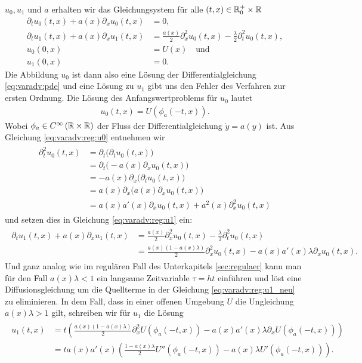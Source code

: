 $u_0, u_1$ und $a$ erhalten wir das Gleichungsystem für alle $(t,x) \in \mathbb R^+_0
\times \mathbb R$
\begin{align}
\label{eq:varadv:reg:u0}
\partial_t u_0(t,x) + a(x) \partial_x u_0(t, x) &= 0,\\
\label{eq:varadv:reg:u1}
\partial_t u_1(t,x) + a(x) \partial_x u_1(t, x) &= \frac{a(x)}{2} \partial^2_x u_0(t,x) - \frac{\lambda}{2} \partial^2_t u_0(t,x),\\
u_0(0,x) &= U(x) \quad \text{und}\\
u_1(0,x) &= 0.
\end{align}
Die Abbildung $u_0$ ist dann also eine Lösung der Differentialgleichung
\eqref{eq:varadv:pde} und eine Lösung zu $u_1$ gibt uns den Fehler des Verfahren
zur ersten Ordnung.
Die Lösung des Anfangswertproblems für $u_0$ lautet 
\begin{align}
\label{eq:varadv:reg:u0_loesung}
u_0(t,x) = U( \phi_a(-t, x) ).
\end{align}
Wobei $\phi_a \in C^\infty \left( \mathbb R \times \mathbb R \right)$ der Fluss der Differentialgleichung $\dot y = a(y)$ ist.
Aus Gleichung \eqref{eq:varadv:reg:u0} entnehmen wir
\begin{align}
\begin{split}
\partial^2_t u_0(t,x) &= \partial_t \bigl( \partial_t u_0(t,x) \bigr)\\
&= \partial_t \bigl( - a(x) \partial_x u_0(t, x) \bigr)\\
&= - a(x) \partial_x \bigl( \partial_t u_0(t, x) \bigr)\\
&= a(x) \partial_x \bigl( a(x) \partial_x u_0(t, x) \bigr)\\
&= a(x) a'(x) \partial_x u_0(t,x) + a^2(x) \partial^2_x u_0(t,x)
\end{split}
\end{align}
und setzen dies in Gleichung \eqref{eq:varadv:reg:u1} ein:
\begin{align}\label{eq:varadv:reg:u1_neu}
\begin{split}
\partial_t u_1(t,x) + a(x) \partial_x u_1(t, x) &= \frac{a(x)}{2} \partial^2_x u_0(t,x) - \frac{\lambda}{2} \partial^2_t u_0(t,x)\\
&= \frac{a(x)(1 - a(x) \lambda)}{2} \partial^2_x u_0(t,x) - a(x) a'(x) \lambda \partial_x u_0(t,x).
\end{split}
\end{align}
Und ganz analog wie im regulären Fall des Unterkapitels \ref{sec:regulaer} kann
man für den Fall $a(x)\lambda < 1$ ein langsame Zeitvariable $\tau = ht$
einführen und löst eine Diffusionsgleichung um die Quellterme in der Gleichung
\eqref{eq:varadv:reg:u1_neu} zu eliminieren.
In dem Fall, dass in einer offenen Umgebung $U$ die Ungleichung $a(x)\lambda > 1$
gilt, schreiben wir für $u_1$ die Lösung
\begin{align}
\begin{split}
u_1(t,x) &= t \left( \frac{a(x)(1 - a(x) \lambda)}{2} \partial^2_x U( \phi_a(-t, x) ) - a(x) a'(x) \lambda \partial_x U( \phi_a(-t, x) )\right)\\
&= t a(x) a'(x) \left( \frac{1 - a(x) \lambda}{2} U''( \phi_a(-t, x) ) - a(x) \lambda U'( \phi_a(-t, x) )\right).
\end{split}
\end{align}

